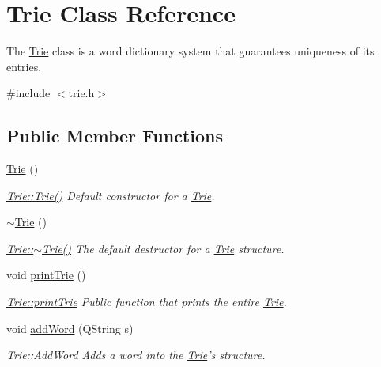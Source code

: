 \hypertarget{class_trie}{\section{Trie Class Reference}
\label{class_trie}
}


The \hyperlink{class_trie}{Trie} class is a word dictionary system that guarantees uniqueness of its entries.  




{\ttfamily \#include $<$trie.\-h$>$}

\subsection*{Public Member Functions}
\begin{DoxyCompactItemize}
\item 
\hyperlink{class_trie_a6af57e9f25d0d0a2d59eea5a4a802908}{Trie} ()
\begin{DoxyCompactList}\small\item\em \hyperlink{class_trie_a6af57e9f25d0d0a2d59eea5a4a802908}{Trie\-::\-Trie()} Default constructor for a \hyperlink{class_trie}{Trie}. \end{DoxyCompactList}\item 
\hyperlink{class_trie_abf9d6f48d556e09d1b292412df153a4b}{$\sim$\-Trie} ()
\begin{DoxyCompactList}\small\item\em \hyperlink{class_trie_abf9d6f48d556e09d1b292412df153a4b}{Trie\-::$\sim$\-Trie()} The default destructor for a \hyperlink{class_trie}{Trie} structure. \end{DoxyCompactList}\item 
void \hyperlink{class_trie_a68065bc13f6c49bb7f139290cceff091}{print\-Trie} ()
\begin{DoxyCompactList}\small\item\em \hyperlink{class_trie_a68065bc13f6c49bb7f139290cceff091}{Trie\-::print\-Trie} Public function that prints the entire \hyperlink{class_trie}{Trie}. \end{DoxyCompactList}\item 
void \hyperlink{class_trie_a6bad63197c025fd1d7dab898dc7193db}{add\-Word} (Q\-String s)
\begin{DoxyCompactList}\small\item\em Trie\-::\-Add\-Word Adds a word into the \hyperlink{class_trie}{Trie}'s structure. \end{DoxyCompactList}\item 

\end{DoxyCompactItemize}
